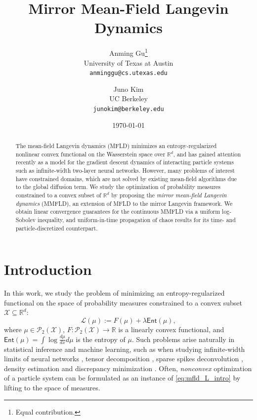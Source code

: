 \documentclass{article}
\title{Mirror Mean-Field Langevin Dynamics}
\author{
Anming Gu\thanks{Equal contribution.}\\
University of Texas at Austin \\ 
{\texttt{anminggu@cs.utexas.edu}}
\and
Juno Kim\footnotemark[1]\\
UC Berkeley \\
{\texttt{junokim@berkeley.edu}}
}
\date{\today}
\begin{document}
\maketitle

\begin{abstract}
    The mean-field Langevin dynamics (MFLD) minimizes an entropy-regularized nonlinear convex functional on the Wasserstein space over $\mathbb{R}^d$, and has gained attention recently as a model for the gradient descent dynamics of interacting particle systems such as infinite-width two-layer neural networks. However, many problems of interest have constrained domains, which are not solved by existing mean-field algorithms due to the global diffusion term. We study the optimization of probability measures constrained to a convex subset of $\mathbb{R}^d$ by proposing the \emph{mirror mean-field Langevin dynamics} (MMFLD), an extension of MFLD to the mirror Langevin framework. We obtain linear convergence guarantees for the continuous MMFLD via a uniform log-Sobolev inequality, and uniform-in-time propagation of chaos results for its time- and particle-discretized counterpart.
\end{abstract}

\section{Introduction}
In this work, we study the problem of minimizing an entropy-regularized functional on the space of probability measures constrained to a convex subset $\mathcal{X}\subseteq\mathbb{R}^d$:
\begin{equation}\label{eq:mfld_L_intro}
\mathcal{L}(\mu) := F(\mu) + \lambda {\mathsf{Ent}}(\mu),
\end{equation}
where $\mu\in\mathcal{P}_2(\mathcal{X})$, $F: \mathcal{P}_2(\mathcal{X})\to\mathbb{R}$ is a linearly convex functional, and $\mathsf{Ent}(\mu) = \int \log\frac{d\mu}{dx}d\mu$ is the entropy of $\mu$. Such problems arise naturally in statistical inference and machine learning, such as when studying infinite-width limits of neural networks \citep{mei2018meanfield,nitanda2022convex,suzuki2023feature,takakura2024meanfield}, tensor decomposition \citep{chizat2018global}, sparse spikes deconvolution \citep{chizat2018global}, density estimation \citep{suzuki2023meanfield} and discrepancy minimization \citep{gretton12,suzuki2023meanfield}. Often, \emph{nonconvex} optimization of a particle system can be formulated as an instance of \eqref{eq:mfld_L_intro} by lifting to the space of measures.
\end{document}
